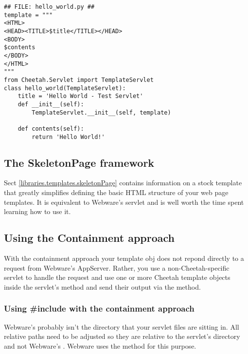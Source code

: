 \begin{verbatim}
## FILE: hello_world.py ##
template = """
<HTML>
<HEAD><TITLE>$title</TITLE></HEAD>
<BODY>
$contents
</BODY>
</HTML>
"""
from Cheetah.Servlet import TemplateServlet
class hello_world(TemplateServlet):
    title = 'Hello World - Test Servlet'
    def __init__(self):
        TemplateServlet.__init__(self, template) 

    def contents(self):
        return 'Hello World!'
\end{verbatim}


\subsection{The SkeletonPage framework}
\label{webware.skeletonPage}

Sect \ref{libraries.templates.skeletonPage} contains information on a stock
template that greatly simplifies defining the basic HTML structure of your web
page templates.  It is equivalent to Webware's  servlet and
is well worth the time spent learning how to use it.

\subsection{Using the Containment approach}
\label{webware.containment}

With the containment approach your template obj does not repond directly to a
request from Webware's AppServer. Rather, you use a non-Cheetah-specific servlet
to handle the request and use one or more Cheetah template objects inside the
servlet's  method and send their output via the 
 method.

\subsubsection{Using \#include with the containment approach}
\label{webware.includes}

Webware's  probably isn't the directory that
your servlet files are sitting in.  All relative paths need to be adjusted so
they are relative to the servlet's directory and not Webware's .  Webware uses the  method
for this purpose. 

